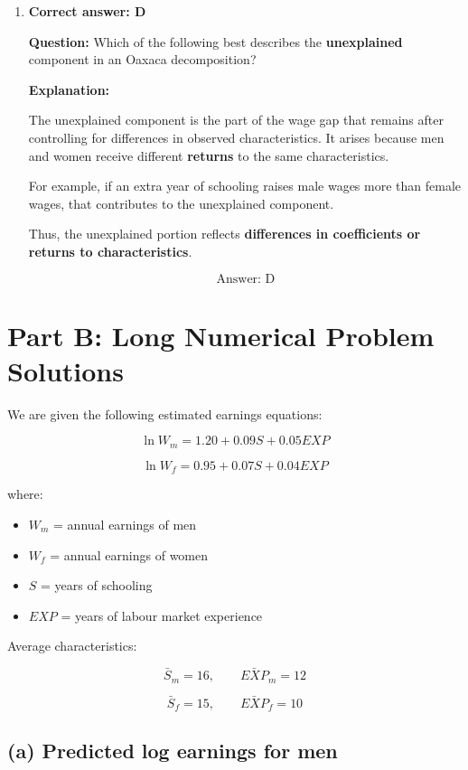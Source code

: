 \documentclass[12pt]{article}
\begin{document}
\begin{enumerate}[label=\textbf{\arabic*.}]
\[
\boxed{\text{Answer: A}}
\]

\item \textbf{Correct answer: D}

\textbf{Question:} Which of the following best describes the \textbf{unexplained} component in an Oaxaca decomposition?

\textbf{Explanation:}

The unexplained component is the part of the wage gap that remains after controlling for differences in observed characteristics. It arises because men and women receive different \textbf{returns} to the same characteristics.

For example, if an extra year of schooling raises male wages more than female wages, that contributes to the unexplained component.

Thus, the unexplained portion reflects \textbf{differences in coefficients or returns to characteristics}.

\[
\boxed{\text{Answer: D}}
\]

\end{enumerate}

\vspace{1em}

\section*{Part B: Long Numerical Problem Solutions}

We are given the following estimated earnings equations:

\[
\ln W_m = 1.20 + 0.09S + 0.05EXP
\]

\[
\ln W_f = 0.95 + 0.07S + 0.04EXP
\]

where:

\begin{itemize}
    \item \(W_m\) = annual earnings of men
    \item \(W_f\) = annual earnings of women
    \item \(S\) = years of schooling
    \item \(EXP\) = years of labour market experience
\end{itemize}

Average characteristics:

\[
\bar{S}_m = 16, \qquad \bar{EXP}_m = 12
\]

\[
\bar{S}_f = 15, \qquad \bar{EXP}_f = 10
\]

\subsection*{(a) Predicted log earnings for men}
\end{document}
